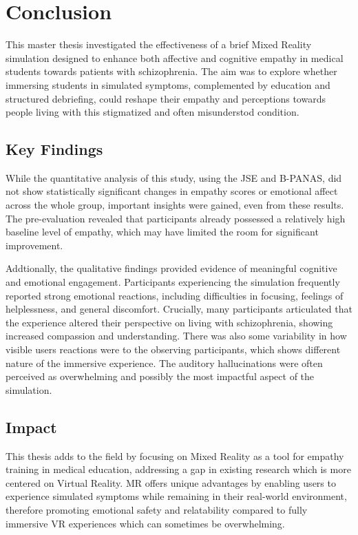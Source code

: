 \chapter{Conclusion}
\label{ch:conclusions}


This master thesis investigated the effectiveness of a brief Mixed Reality simulation designed to enhance both affective and cognitive empathy in medical students towards patients with schizophrenia. The aim was to explore whether immersing students in simulated symptoms, complemented by education and structured debriefing, could reshape their empathy and perceptions towards people living with this stigmatized and often misunderstod condition.

\section{Key Findings}
While the quantitative analysis of this study, using the JSE and B-PANAS, did not show statistically significant changes in empathy scores or emotional affect across the whole group, important insights were gained, even from these results. The pre-evaluation revealed that participants already possessed a relatively high baseline level of empathy, which may have limited the room for significant improvement.

\vspace{1em}

Addtionally, the qualitative findings provided evidence of meaningful cognitive and emotional engagement. Participants experiencing the simulation frequently reported strong emotional reactions, including difficulties in focusing, feelings of helplessness, and general discomfort. Crucially, many participants articulated that the experience altered their perspective on living with schizophrenia, showing increased compassion and understanding. There was also some variability in how visible users reactions were to the observing participants, which shows different nature of the immersive experience. The auditory hallucinations were often perceived as overwhelming and possibly the most impactful aspect of the simulation.


\section{Impact}
This thesis adds to the field by focusing on Mixed Reality as a tool for empathy training in medical education, addressing a gap in existing research which is more centered on Virtual Reality. MR offers unique advantages by enabling users to experience simulated symptoms while remaining in their real-world environment, therefore promoting emotional safety and relatability compared to fully immersive VR experiences which can sometimes be overwhelming.

